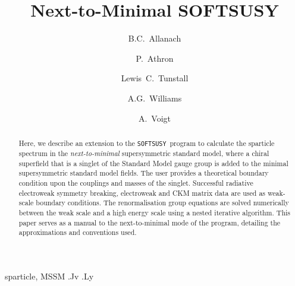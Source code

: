 \documentclass[final,3p,times,pdflatex]{elsarticle}
\begin{document}
\begin{frontmatter}

\title{Next-to-Minimal SOFTSUSY}

\author{B.C.~Allanach}
\address{DAMTP, CMS, University of Cambridge, Wilberforce road, Cambridge, CB3
  0WA, United Kingdom}

\author{P.~Athron}
\author{Lewis~C.~Tunstall}
\author{A.G.~Williams}
\address{ARC Centre of Excellence for Particle Physics at 
the Tera-scale, School of Chemistry and Physics, University of Adelaide, 
Adelaide SA 5005 Australia}

\author{A.~Voigt}
\address{Dipl.-Phys. Alexander Voigt,
Institut für Kern- und Teilchenphysik,
Helmholtzstraße 10, 
D-01069 Dresden,
Germany}
\begin{abstract}
  Here, we describe an extension to the
  {\tt SOFTSUSY}~program to calculate the sparticle spectrum in the
  {\em next-to-minimal} supersymmetric standard model, where a chiral
  superfield that is a singlet of the Standard Model gauge group is added to
  the minimal supersymmetric standard model fields. 
  The user provides a theoretical boundary condition upon the couplings and
  masses of the singlet.
  Successful radiative electroweak symmetry breaking,
  electroweak and CKM matrix data are used
  as weak-scale boundary conditions. 
  The renormalisation group equations are solved
  numerically between the weak scale and a high energy scale using a nested
  iterative algorithm. 
  This paper serves as a manual to the
  next-to-minimal mode of the program, detailing the approximations and
  conventions used. 
\end{abstract}

\begin{keyword}
sparticle, 
MSSM
.Jv
.Ly
\end{keyword}
\end{frontmatter}
\end{document}
